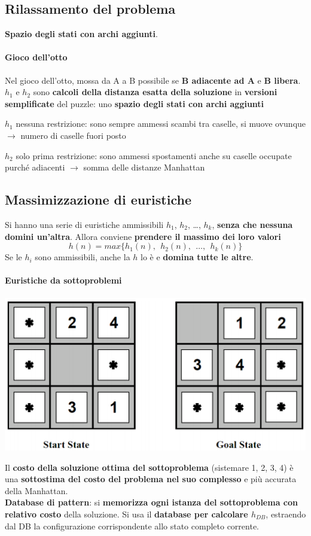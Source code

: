 \documentclass[10pt]{book}
\begin{document}
\subsection{Rilassamento del problema}
\textbf{Spazio degli stati con archi aggiunti}.
\paragraph{Gioco dell'otto} Nel gioco dell'otto, mossa da A a B possibile se \textbf{B adiacente ad A} e \textbf{B libera}.\\
$h_1$ e $h_2$ sono \textbf{calcoli della distanza esatta della soluzione} in \textbf{versioni semplificate} del puzzle: uno \textbf{spazio degli stati con archi aggiunti}
\begin{list}{}{}
	\item $h_1$ nessuna restrizione: sono sempre ammessi scambi tra caselle, si muove ovunque $\rightarrow$ numero di caselle fuori posto
	\item $h_2$ solo prima restrizione: sono ammessi spostamenti anche su caselle occupate purché adiacenti $\rightarrow$ somma delle distanze Manhattan
\end{list}
\subsection{Massimizzazione di euristiche}
Si hanno una serie di euristiche ammissibili $h_1$, $h_2$, \ldots, $h_k$, \textbf{senza che nessuna domini un'altra}. Allora conviene \textbf{prendere il massimo dei loro valori} $$h(n) = max\{h_1(n),\:\:h_2(n),\:\:\ldots,\:\:h_k(n)\}$$ Se le $h_i$ sono ammissibili, anche la $h$ lo è e \textbf{domina tutte le altre}.
\pagebreak
\paragraph{Euristiche da sottoproblemi}
\begin{center}
	\includegraphics[scale=0.7]{eursottoprob.png}
\end{center}
Il \textbf{costo della soluzione ottima del sottoproblema} (sistemare 1, 2, 3, 4) è una \textbf{sottostima del costo del problema nel suo complesso} e più accurata della Manhattan.\\
\textbf{Database di pattern}: si \textbf{memorizza ogni istanza del sottoproblema con relativo costo} della soluzione. Si usa il \textbf{database per calcolare $h_{DB}$}, estraendo dal DB la configurazione corrispondente allo stato completo corrente.
\end{document}
